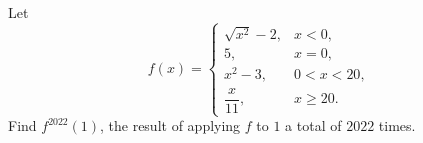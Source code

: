 Let
\[f(x)=\begin{cases}\sqrt{x^2}-2,&x<0,\\5,&x=0,\\x^2-3,&0<x<20,\\ \dfrac x{11},&x\ge20.\end{cases}\]
Find $f^{2022}(1)$, the result of applying $f$ to $1$ a total of $2022$ times.
